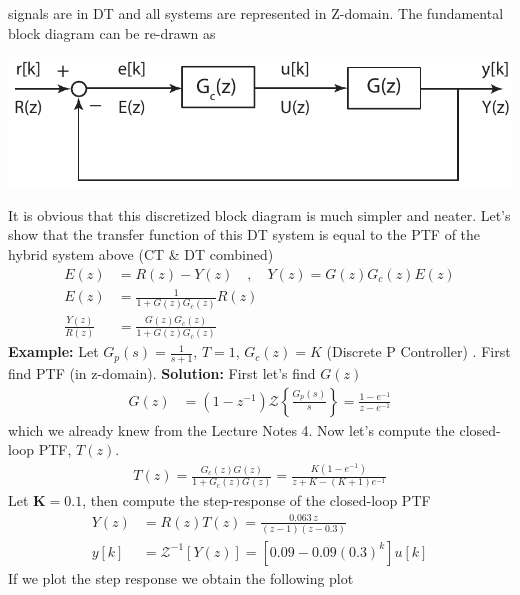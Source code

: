 \documentclass[twoside]{article}
\begin{document}
signals are in DT and  all systems are represented in Z-domain.
The fundamental block diagram can be re-drawn as
%
    \begin{center}
\begin{minipage}[h]{0.75\linewidth}
    \begin{center}
      \includegraphics[width=\textwidth]{discreteblock}
    \end{center}
\end{minipage}
    \end{center}
%
It is obvious that this discretized block diagram is much simpler
and neater. Let's show that the transfer function of this DT system
is equal to the PTF of the hybrid system above (CT \& DT combined)
%
\begin{align*}
E(z) &= R(z) - Y(z) \quad , \quad Y(z) = G(z) G_c(z) E(z)
\\
E(z) &= \frac{1}{1 + G(z) G_c(z)} R(z)
\\
\frac{Y(z)}{R(z)} &= \frac{G(z) G_c(z)}{1 + G(z) G_c(z)} 
\end{align*}
%
\textbf{Example:} Let $G_p(s) = \frac{1}{s+1}$, $T=1$, $G_c(z) =
K$ (Discrete P Controller) . First find PTF (in z-domain).
%
\textbf{Solution:} First let's find $G(z)$ 
%
\begin{align*}
  G(z) &= (1 - z^{-1}) \mathcal{Z} \left\lbrace \frac{G_p(s)}{s}  \right\rbrace =
         \frac{1-e^{-1}}{z - e^{-1}} 
\end{align*}
%
which we already knew from the Lecture Notes 4. Now let's compute the
closed-loop PTF, $T(z)$.
%
\begin{align*}
T(z) =  \frac{G_c(z) G(z)}{1 + G_c(z) G(z)} = \frac{K(1 -e^{-1})}{z + K - (K+1) e^{-1}} 
\end{align*}
%
Let $\mathbf{K = 0.1}$, then compute the step-response of the closed-loop PTF
%
\begin{align*}
Y(z) &= R(z) T(z) = \frac{0.063 \, z}{(z-1)(z-0.3)}
\\
y[k] &= \mathcal{Z}^{-1} [ Y(z) ] = \left[  0.09 - 0.09 (0.3)^k
  \right] u[k]
\end{align*}
%
If we plot the step response we obtain the following plot
%
\end{document}
